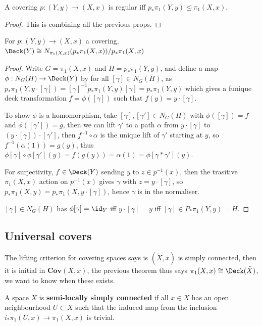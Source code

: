 \documentclass{article}
\begin{document}
\begin{theorem}
    A covering $p:(Y,y)\rightarrow (X,x)$ is regular iff $p_*\pi_1(Y,y)\unlhd \pi_1(X,x)$.\begin{proof}
        This is combining all the previous props.
    \end{proof}
\end{theorem}

\begin{theorem}
    For $p:(Y,y)\rightarrow (X,x)$ a covering, $\Deck(Y)\cong N_{\pi_1(X,x)}(p_*\pi_1(X,x))/p_*\pi_1(X,x)$\begin{proof}
        Write $G = \pi_1(X,x)$ and $H=p_*\pi_1(Y,y)$, and define a map $\phi:N_G(H)\rightarrow \Deck(Y)$ by for all $[\gamma]\in N_G(H)$, as $p_*\pi_1(Y,y\cdot[\gamma]) = [\gamma]^{-1}p_*\pi_1(Y,y)[\gamma] = p_*\pi_1(Y,y)$ which gives a funique deck transformation $f=\phi([\gamma])$ such that $f(y)=y\cdot[\gamma]$.

        To show $\phi$ is a homomorphism, take $[\gamma],[\gamma']\in N_G(H)$ with $\phi([\gamma])=f$ and $\phi([\gamma'])=g$, then we can lift $\gamma'$ to a path $\alpha$ from $y\cdot [\gamma]$ to $(y\cdot [\gamma])\cdot [\gamma']$, then $f^{-1}\circ \alpha$ is the unique lift of $\gamma'$ starting at $y$, so $f^{-1}(\alpha(1)) = g(y)$, thus $\phi[\gamma]\circ\phi[\gamma'](y) = f(g(y)) = \alpha(1)= \phi[\gamma *\gamma'](y)$.

        For surjectivity, $f\in \Deck(Y)$ sending $y$ to $z\in p^{-1}(x)$, then the trasitive $\pi_1(X,x)$ action on $p^{-1}(x)$ gives $\gamma$ with $z=y\cdot[\gamma]$, so $p_*\pi_1(X,y)=p_*\pi_1(X,y\cdot [\gamma])$, hence $\gamma$ is in the normaliser.

        $[\gamma]\in N_G(H)$ has $\phi[\gamma]=\id_Y$ iff $y\cdot[\gamma]=y$ iff $[\gamma]\in P_*\pi_1(Y,y)=H$.
    \end{proof}
\end{theorem}

\subsection{Universal covers}

The lifting criterion for covering spaces says is $(\tilde{X},\tilde{x})$ is simply connected, then it is initial in $\mathbf{Cov}(X,x)$, the previous theorem thus says $\pi_1(X,x)\cong \Deck(\tilde{X})$, we want to know when these exists.

\begin{definition}
    A space $X$ is \textbf{semi-locally simply connected} if all $x\in X$ has an open neighbourhood $U\subset X$ such that the induced map from the inclusion $i_*\pi_1(U,x)\rightarrow \pi_1(X,x)$ is trivial.
\end{definition}
\end{document}
